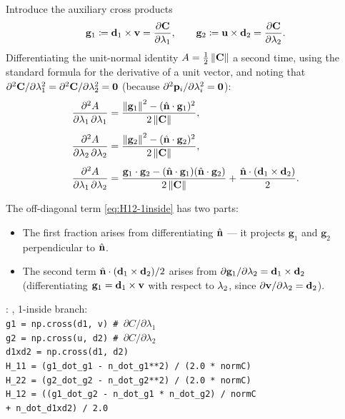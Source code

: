 \documentclass[11pt,a4paper]{article}
\begin{document}
Introduce the auxiliary cross products
\begin{equation}
  \mathbf{g}_1 \coloneqq \mathbf{d}_{1} \times \mathbf{v}
    = \dfrac{\partial \mathbf{C}}{\partial \lambda_1},
  \qquad
  \mathbf{g}_2 \coloneqq \mathbf{u} \times \mathbf{d}_{2}
    = \dfrac{\partial \mathbf{C}}{\partial \lambda_2}.
\end{equation}
Differentiating the unit-normal identity $A = \tfrac{1}{2}\left\|\mathbf{C}\right\|$
a second time, using the standard formula for the derivative of a unit
vector, and noting that $\partial^2 \mathbf{C}/\partial\lambda_1^2 =
\partial^2\mathbf{C}/\partial\lambda_2^2 = \mathbf{0}$ (because
$\partial^2\mathbf{p}_{i}/\partial\lambda_i^2 = \mathbf{0}$):
\begin{align}
  \dfrac{\partial^2 A}{\partial \lambda_1\,\partial \lambda_1}
    &= \frac{\left\|\mathbf{g}_1\right\|^2 - (\hat{\mathbf{n}}\cdot\mathbf{g}_1)^2}
            {2\left\|\mathbf{C}\right\|},
  \label{eq:H11-1inside} \\[4pt]
  \dfrac{\partial^2 A}{\partial \lambda_2\,\partial \lambda_2}
    &= \frac{\left\|\mathbf{g}_2\right\|^2 - (\hat{\mathbf{n}}\cdot\mathbf{g}_2)^2}
            {2\left\|\mathbf{C}\right\|},
  \label{eq:H22-1inside} \\[4pt]
  \dfrac{\partial^2 A}{\partial \lambda_1\,\partial \lambda_2}
    &= \frac{\mathbf{g}_1\cdot\mathbf{g}_2
             - (\hat{\mathbf{n}}\cdot\mathbf{g}_1)(\hat{\mathbf{n}}\cdot\mathbf{g}_2)}
            {2\left\|\mathbf{C}\right\|}
       + \frac{\hat{\mathbf{n}} \cdot (\mathbf{d}_{1} \times \mathbf{d}_{2})}{2}.
  \label{eq:H12-1inside}
\end{align}

The off-diagonal term \eqref{eq:H12-1inside} has two parts:
\begin{itemize}[noitemsep]
  \item The first fraction arises from differentiating $\hat{\mathbf{n}}$ — it
        projects $\mathbf{g}_1$ and $\mathbf{g}_2$ perpendicular to $\hat{\mathbf{n}}$.
  \item The second term $\hat{\mathbf{n}}\cdot(\mathbf{d}_{1}\times\mathbf{d}_{2})/2$ arises from
        $\partial\mathbf{g}_1/\partial\lambda_2 = \mathbf{d}_{1}\times\mathbf{d}_{2}$
        (differentiating $\mathbf{g}_1 = \mathbf{d}_{1}\times\mathbf{v}$ with
        respect to $\lambda_2$, since $\partial\mathbf{v}/\partial\lambda_2 = \mathbf{d}_{2}$).
\end{itemize}

\begin{tcolorbox}[colback=blue!4!white, colframe=blue!40!black,
                  title={Code: 1-inside Hessian}, fontupper=\small]
: ,
1-inside branch:\\[2pt]
\texttt{g1 = np.cross(d1, v) \# $\partial C/\partial\lambda_1$}\\
\texttt{g2 = np.cross(u, d2) \# $\partial C/\partial\lambda_2$}\\
\texttt{d1xd2 = np.cross(d1, d2)}\\
\texttt{H\_11 = (g1\_dot\_g1 - n\_dot\_g1**2) / (2.0 * normC)}\\
\texttt{H\_22 = (g2\_dot\_g2 - n\_dot\_g2**2) / (2.0 * normC)}\\
\texttt{H\_12 = ((g1\_dot\_g2 - n\_dot\_g1 * n\_dot\_g2) / normC}\\
\texttt{\phantom{H\_12 = (}+ n\_dot\_d1xd2) / 2.0}
\end{tcolorbox}
\end{document}

